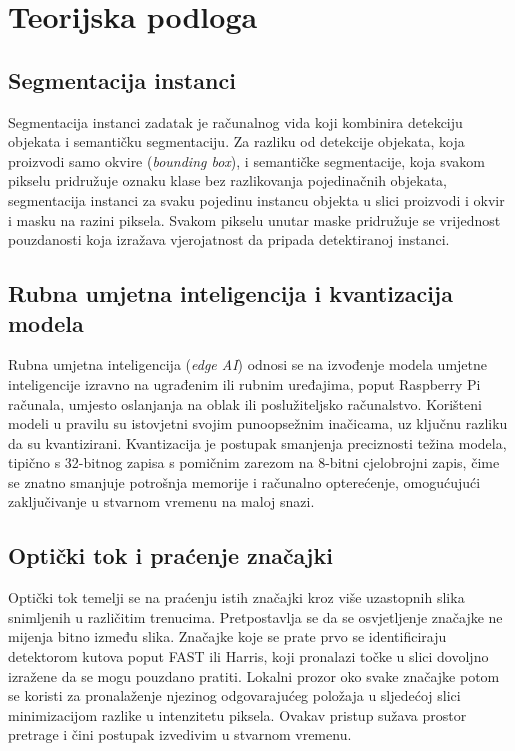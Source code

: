 \section{Teorijska podloga}
\label{sec:teorijska-podloga}

\subsection{Segmentacija instanci}
Segmentacija instanci zadatak je računalnog vida koji kombinira detekciju objekata i semantičku segmentaciju. Za razliku od detekcije objekata, koja proizvodi samo okvire (\emph{bounding box}), i semantičke segmentacije, koja svakom pikselu pridružuje oznaku klase bez razlikovanja pojedinačnih objekata, segmentacija instanci za svaku pojedinu instancu objekta u slici proizvodi i okvir i masku na razini piksela. Svakom pikselu unutar maske pridružuje se vrijednost pouzdanosti koja izražava vjerojatnost da pripada detektiranoj instanci.

\subsection{Rubna umjetna inteligencija i kvantizacija modela}
Rubna umjetna inteligencija (\emph{edge AI}) odnosi se na izvođenje modela umjetne inteligencije izravno na ugrađenim ili rubnim uređajima, poput Raspberry Pi računala, umjesto oslanjanja na oblak ili poslužiteljsko računalstvo. Korišteni modeli u pravilu su istovjetni svojim punoopsežnim inačicama, uz ključnu razliku da su kvantizirani. Kvantizacija je postupak smanjenja preciznosti težina modela, tipično s 32-bitnog zapisa s pomičnim zarezom na 8-bitni cjelobrojni zapis, čime se znatno smanjuje potrošnja memorije i računalno opterećenje, omogućujući zaključivanje u stvarnom vremenu na maloj snazi.

\subsection{Optički tok i praćenje značajki}
Optički tok temelji se na praćenju istih značajki kroz više uzastopnih slika snimljenih u različitim trenucima. Pretpostavlja se da se osvjetljenje značajke ne mijenja bitno između slika. Značajke koje se prate prvo se identificiraju detektorom kutova poput FAST ili Harris, koji pronalazi točke u slici dovoljno izražene da se mogu pouzdano pratiti. Lokalni prozor oko svake značajke potom se koristi za pronalaženje njezinog odgovarajućeg položaja u sljedećoj slici minimizacijom razlike u intenzitetu piksela. Ovakav pristup sužava prostor pretrage i čini postupak izvedivim u stvarnom vremenu.


